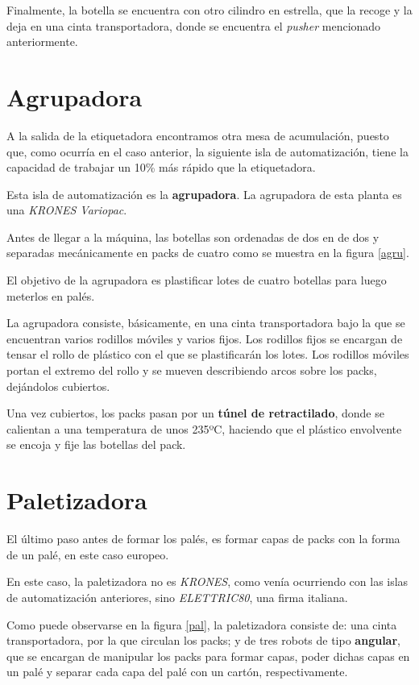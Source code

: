 \documentclass[11pt,a4paper,spanish,twoside]{report}
\begin{document}
Finalmente, la botella se encuentra con otro cilindro en estrella, que la
recoge y la deja en una cinta transportadora, donde se encuentra el 
\emph{pusher} mencionado anteriormente.

\section{Agrupadora}
A la salida de la etiquetadora encontramos otra mesa de acumulación, puesto 
que, como ocurría en el caso anterior, la siguiente isla de automatización, 
tiene la capacidad de trabajar un 10\% más rápido que la etiquetadora.

Esta isla de automatización es la \textbf{agrupadora}. La agrupadora de esta 
planta es una \emph{KRONES Variopac}.

Antes de llegar a la máquina, las botellas son ordenadas de dos en de dos y 
separadas mecánicamente en packs de cuatro como se muestra en la figura
\ref{agru}. 


El objetivo de la agrupadora es plastificar lotes de cuatro botellas para
luego meterlos en palés.

La agrupadora consiste, básicamente, en una cinta transportadora bajo la que 
se encuentran varios rodillos móviles y varios fijos. Los rodillos fijos se 
encargan de tensar el rollo de plástico con el que se plastificarán los lotes.
Los rodillos móviles portan el extremo del rollo y se mueven describiendo 
arcos sobre los packs, dejándolos cubiertos.

Una vez cubiertos, los packs pasan por un \textbf{túnel de retractilado}, 
donde se calientan a una temperatura de unos 235ºC, haciendo que el plástico
envolvente se encoja y fije las botellas del pack.

\section{Paletizadora}
El último paso antes de formar los palés, es formar capas de packs con la 
forma de un palé, en este caso europeo.

En este caso, la paletizadora no es \emph{KRONES}, como venía ocurriendo con las 
islas de automatización anteriores, sino \emph{ELETTRIC80}, una firma italiana.

Como puede observarse en la figura \ref{pal}, la paletizadora consiste de: una cinta transportadora, por la que circulan los
packs; y de tres robots de tipo \textbf{angular}, que se encargan de manipular los 
packs para formar capas, poder dichas capas en un palé y separar cada capa del 
palé con un cartón, respectivamente.
\end{document}
